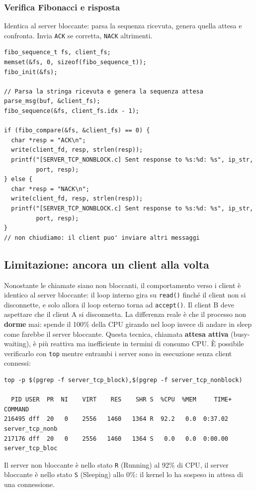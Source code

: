 \documentclass[a4paper,12pt]{article}
\begin{document}
\subsubsection{Verifica Fibonacci e risposta}
Identica al server bloccante: parsa la sequenza ricevuta, genera quella attesa
e confronta. Invia \texttt{ACK} se corretta, \texttt{NACK} altrimenti.

\begin{lstlisting}[caption={server\_tcp\_nonblock.c - verifica e risposta}]
fibo_sequence_t fs, client_fs;
memset(&fs, 0, sizeof(fibo_sequence_t));
fibo_init(&fs);

// Parsa la stringa ricevuta e genera la sequenza attesa
parse_msg(buf, &client_fs);
fibo_sequence(&fs, client_fs.idx - 1);

if (fibo_compare(&fs, &client_fs) == 0) {
  char *resp = "ACK\n";
  write(client_fd, resp, strlen(resp));
  printf("[SERVER_TCP_NONBLOCK.c] Sent response to %s:%d: %s", ip_str,
         port, resp);
} else {
  char *resp = "NACK\n";
  write(client_fd, resp, strlen(resp));
  printf("[SERVER_TCP_NONBLOCK.c] Sent response to %s:%d: %s", ip_str,
         port, resp);
}
// non chiudiamo: il client puo' inviare altri messaggi
\end{lstlisting}
\FloatBarrier

\subsection{Limitazione: ancora un client alla volta}
Nonostante le chiamate siano non bloccanti, il comportamento verso i client è
identico al server bloccante: il loop interno gira su \texttt{read()} finché
il client non si disconnette, e solo allora il loop esterno torna ad
\texttt{accept()}. Il client B deve aspettare che il client A si disconnetta.
\newline
La differenza reale è che il processo non \textbf{dorme} mai: spende il 100\%
della CPU girando nel loop invece di andare in sleep come farebbe il server
bloccante. Questa tecnica, chiamata \textbf{attesa attiva} (busy-waiting), è
più reattiva ma inefficiente in termini di consumo CPU.
\newline
È possibile verificarlo con \texttt{top} mentre entrambi i server sono in
esecuzione senza client connessi:

\begin{lstlisting}[style=output,caption={top -p \$(pgrep -f server\_tcp\_nonblock) - confronto CPU}]
top -p $(pgrep -f server_tcp_block),$(pgrep -f server_tcp_nonblock)

  PID USER  PR  NI    VIRT    RES    SHR S  %CPU  %MEM     TIME+ COMMAND
216495 dff  20   0    2556   1460   1364 R  92.2   0.0  0:37.02 server_tcp_nonb
217176 dff  20   0    2556   1460   1364 S   0.0   0.0  0:00.00 server_tcp_bloc
\end{lstlisting}
\FloatBarrier
Il server non bloccante è nello stato \texttt{R} (Running) al 92\% di CPU,
il server bloccante è nello stato \texttt{S} (Sleeping) allo 0\%: il kernel
lo ha sospeso in attesa di una connessione.
\newline
\end{document}
